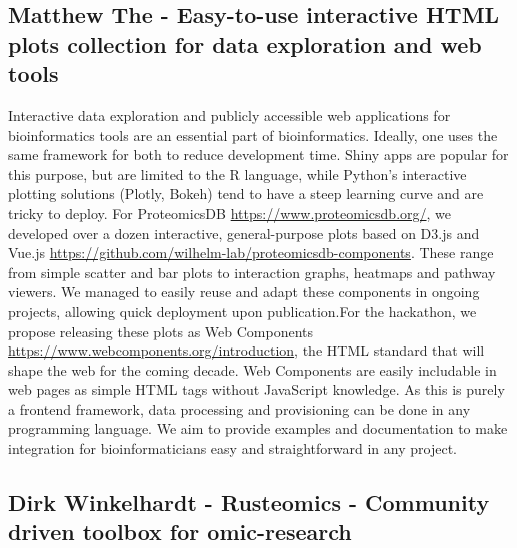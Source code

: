 \subsection{Matthew The - Easy-to-use interactive HTML plots collection for data exploration and web tools}

Interactive data exploration and publicly accessible web applications for bioinformatics tools are an essential part of bioinformatics. Ideally, one uses the same framework for both to reduce development time. Shiny apps are popular for this purpose, but are limited to the R language, while Python’s interactive plotting solutions (Plotly, Bokeh) tend to have a steep learning curve and are tricky to deploy. For ProteomicsDB \url{https://www.proteomicsdb.org/}, we developed over a dozen interactive, general-purpose plots based on D3.js and Vue.js \url{https://github.com/wilhelm-lab/proteomicsdb-components}. These range from simple scatter and bar plots to interaction graphs, heatmaps and pathway viewers. We managed to easily reuse and adapt these components in ongoing projects, allowing quick deployment upon publication.For the hackathon, we propose releasing these plots as Web Components \url{https://www.webcomponents.org/introduction}, the HTML standard that will shape the web for the coming decade. Web Components are easily includable in web pages as simple HTML tags without JavaScript knowledge. As this is purely a frontend framework, data processing and provisioning can be done in any programming language. We aim to provide examples and documentation to make integration for bioinformaticians easy and straightforward in any project.\\


\subsection{Dirk Winkelhardt - Rusteomics - Community driven toolbox for omic-research}

